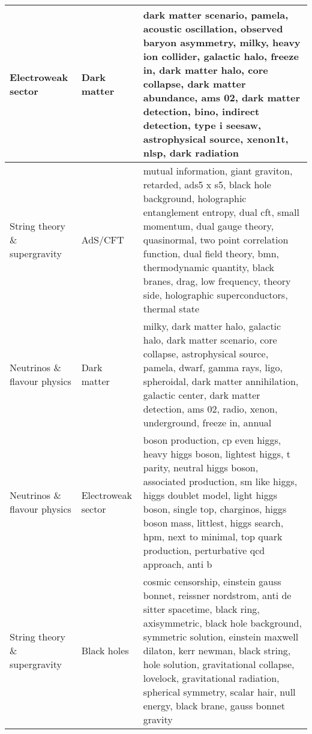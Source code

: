 \begin{longtable}{b{}|b{}|b{}}
\bottomrule
\endlastfoot
           Electroweak sector &          Dark matter &                                                     dark matter scenario, pamela, acoustic oscillation, observed baryon asymmetry, milky, heavy ion collider, galactic halo, freeze in, dark matter halo, core collapse, dark matter abundance, ams 02, dark matter detection, bino, indirect detection, type i seesaw, astrophysical source, xenon1t, nlsp, dark radiation \\ \hline
String theory \& supergravity &              AdS/CFT &                      mutual information, giant graviton, retarded, ads5 x s5, black hole background, holographic entanglement entropy, dual cft, small momentum, dual gauge theory, quasinormal, two point correlation function, dual field theory, bmn, thermodynamic quantity, black branes, drag, low frequency, theory side, holographic superconductors, thermal state \\ \hline
 Neutrinos \& flavour physics &          Dark matter &                                                                                                      milky, dark matter halo, galactic halo, dark matter scenario, core collapse, astrophysical source, pamela, dwarf, gamma rays, ligo, spheroidal, dark matter annihilation, galactic center, dark matter detection, ams 02, radio, xenon, underground, freeze in, annual \\ \hline
 Neutrinos \& flavour physics &   Electroweak sector &                                             boson production, cp even higgs, heavy higgs boson, lightest higgs, t parity, neutral higgs boson, associated production, sm like higgs, higgs doublet model, light higgs boson, single top, charginos, higgs boson mass, littlest, higgs search, hpm, next to minimal, top quark production, perturbative qcd approach, anti b \\ \hline
String theory \& supergravity &          Black holes & cosmic censorship, einstein gauss bonnet, reissner nordstrom, anti de sitter spacetime, black ring, axisymmetric, black hole background, symmetric solution, einstein maxwell dilaton, kerr newman, black string, hole solution, gravitational collapse, lovelock, gravitational radiation, spherical symmetry, scalar hair, null energy, black brane, gauss bonnet gravity \\ \hline
\end{longtable}
